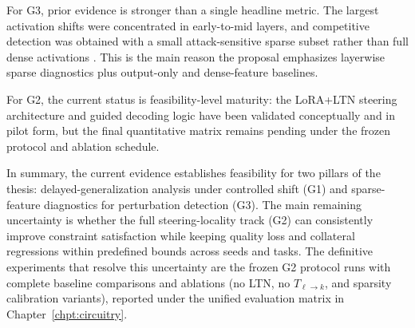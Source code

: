 ﻿\documentclass[../../ppgc-prop-tese.tex]{subfiles}
\begin{document}
For G3, prior evidence is stronger than a single headline metric. The largest activation shifts were concentrated in early-to-mid layers, and competitive detection was obtained with a small attack-sensitive sparse subset rather than full dense activations \cite{carvalho2026interpretable_stego_detection_sae}. This is the main reason the proposal emphasizes layerwise sparse diagnostics plus output-only and dense-feature baselines.

For G2, the current status is feasibility-level maturity: the LoRA+LTN steering architecture and guided decoding logic have been validated conceptually and in pilot form, but the final quantitative matrix remains pending under the frozen protocol and ablation schedule.

In summary, the current evidence establishes feasibility for two pillars of the thesis: delayed-generalization analysis under controlled shift (G1) and sparse-feature diagnostics for perturbation detection (G3). The main remaining uncertainty is whether the full steering-locality track (G2) can consistently improve constraint satisfaction while keeping quality loss and collateral regressions within predefined bounds across seeds and tasks. The definitive experiments that resolve this uncertainty are the frozen G2 protocol runs with complete baseline comparisons and ablations (no LTN, no $T_{\ell\to k}$, and sparsity calibration variants), reported under the unified evaluation matrix in Chapter~\ref{chpt:circuitry}.
\end{document}

